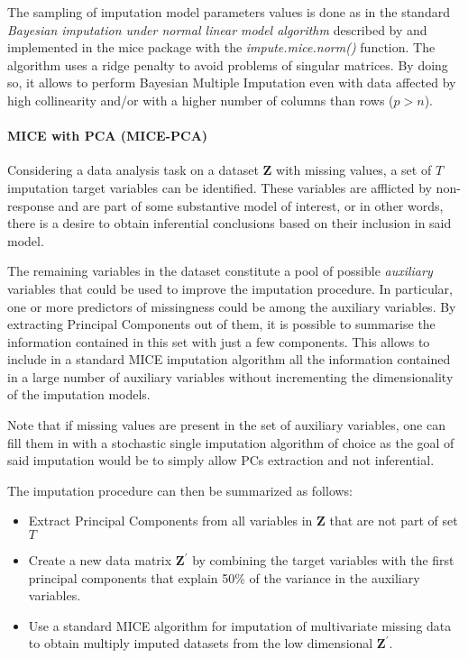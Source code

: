 	The sampling of imputation model parameters 
	values is done as in the standard \emph{Bayesian imputation under normal linear model algorithm} described by
	\citep[p. 68, algorithm 3.1]{vanBuuren:2012} and implemented in the mice package with the \emph{impute.mice.norm()}
	function. The algorithm uses a ridge penalty to avoid problems of singular matrices. By doing so, it allows to 
	perform Bayesian Multiple Imputation even with data affected by high collinearity and/or with a higher number 
	of columns than rows ($p > n$).

\paragraph{MICE with PCA (MICE-PCA)}
	Considering a data analysis task on a dataset $\bm{Z}$ with missing values, a set of $T$ imputation target 
	variables can be identified. These variables are afflicted by non-response and are part of some substantive
	model of interest, or in other words, there is a desire to obtain inferential conclusions based on their 
	inclusion in said model.

	The remaining variables in the dataset constitute a pool of possible \emph{auxiliary} variables that
	could be used to improve the imputation procedure. In particular, one or more predictors of missingness 
	could be among the auxiliary variables. By extracting Principal Components out of them, it is possible
	to summarise the information contained in this set with just a few components. This allows to include in
	a standard MICE imputation algorithm all the information contained in a large number of auxiliary variables
	without incrementing the dimensionality of the imputation models.

	Note that if missing values are present in the set of auxiliary variables, one can fill them in with a 
	stochastic single imputation algorithm of choice as the goal of said imputation would be to simply
	allow PCs extraction and not inferential.

	The imputation procedure can then be summarized as follows:

	\begin{itemize}

	\item Extract Principal Components from all variables in $\bm{Z}$ that are not part of set $T$
	\item Create a new data matrix $\bm{Z}^{'}$ by combining the target variables with the first principal
		components that explain 50\% of the variance in the auxiliary variables.
	\item Use a standard MICE algorithm for imputation of multivariate missing data to obtain multiply
		imputed datasets from the low dimensional $\bm{Z}^{'}$.
	\end{itemize}

